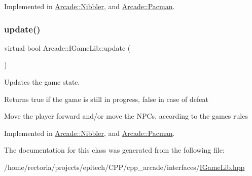 Implemented in \hyperlink{class_arcade_1_1_nibbler_ab88c7e92e23e603b6bd1ccbb6c1ab844}{Arcade\+::\+Nibbler}, and \hyperlink{class_arcade_1_1_pacman_a2787800feab139ddeabb11d6ee23a80e}{Arcade\+::\+Pacman}.

\mbox{\label{class_arcade_1_1_i_game_lib_a0be7ffaa269e2fa47146bf27ad2c511a}} 
\subsubsection{\texorpdfstring{update()}{update()}}
{\footnotesize\ttfamily virtual bool Arcade\+::\+I\+Game\+Lib\+::update (\begin{DoxyParamCaption}{ }\end{DoxyParamCaption})\hspace{0.3cm}{\ttfamily [pure virtual]}}



Updates the game state. 

\begin{DoxyReturn}{Returns}
true if the game is still in progress, false in case of defeat
\end{DoxyReturn}
Move the player forward and/or move the N\+P\+Cs, according to the game\textquotesingle{}s rules 

Implemented in \hyperlink{class_arcade_1_1_nibbler_a13199140bc927065b1c59ae2c70e06cf}{Arcade\+::\+Nibbler}, and \hyperlink{class_arcade_1_1_pacman_aacb11530e954870a6939d91794cbe356}{Arcade\+::\+Pacman}.



The documentation for this class was generated from the following file\+:\begin{DoxyCompactItemize}
\item 
/home/rectoria/projects/epitech/\+C\+P\+P/cpp\+\_\+arcade/interfaces/\hyperlink{_i_game_lib_8hpp}{I\+Game\+Lib.\+hpp}\end{DoxyCompactItemize}
